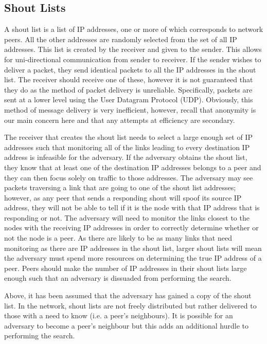 \documentclass[ %
                    author={Luke Murray},
                supervisor={Dr. Simon Hollis},
                     title={Shadow Peer-to-Peer Networks},
                  subtitle={},
                    degree={MEng},
                      year={2013} ]{thesis}
\begin{document}
\subsection{Shout Lists}

A shout list is a list of IP addresses, one or more of which corresponds to network peers. All the other addresses are randomly selected from the set of all IP addresses. This list is created by the receiver and given to the sender. This allows for uni-directional communication from sender to receiver. If the sender wishes to deliver a packet, they send identical packets to all the IP addresses in the shout list. The receiver should receive one of these, however it is not guaranteed that they do as the method of packet delivery is unreliable. Specifically, packets are sent at a lower level using the User Datagram Protocol (UDP). Obviously, this method of message delivery is very inefficient, however, recall that anonymity is our main concern here and that any attempts at efficiency are secondary.

The receiver that creates the shout list needs to select a large enough set of IP addresses such that monitoring all of the links leading to every destination IP address is infeasible for the adversary. If the adversary obtains the shout list, they know that at least one of the destination IP addresses belongs to a peer and they can then focus solely on traffic to those addresses. The adversary may see packets traversing a link that are going to one of the shout list addresses; however, as any peer that sends a responding shout will spoof its source IP address, they will not be able to tell if it is the node with that IP address that is responding or not. The adversary will need to monitor the links closest to the nodes with the receiving IP addresses in order to correctly determine whether or not the node is a peer. As there are likely to be as many links that need monitoring as there are IP addresses in the shout list, larger shout lists will mean the adversary must spend more resources on determining the true IP address of a peer. Peers should make the number of IP addresses in their shout lists large enough such that an adversary is dissuaded from performing the search.

Above, it has been assumed that the adversary has gained a copy of the shout list. In the network, shout lists are not freely distributed but rather delivered to those with a need to know (i.e. a peer's neighbours). It is possible for an adversary to become a peer's neighbour but this adds an additional hurdle to performing the search.
\end{document}
